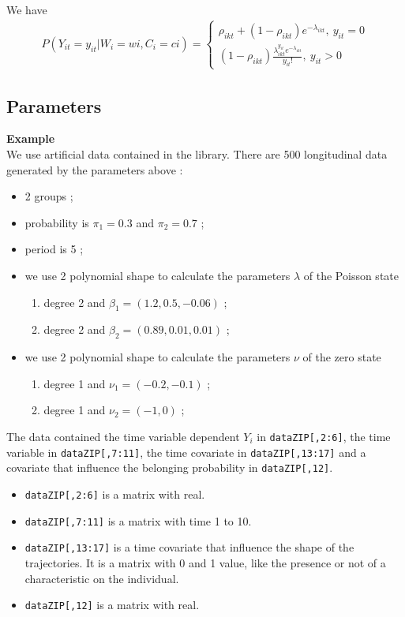 \documentclass{article}\usepackage[]{graphicx}\usepackage[]{color}
\begin{document}
We have
\begin{align}
P\left(Y_{it}=y_{it}|W_i=wi, C_i=ci\right) =
\left\lbrace
\begin{array}{l}
\rho_{ikt}+(1-\rho_{ikt})e^{-\lambda_{ikt}},\ y_{it}=0 \\
(1-\rho_{ikt})\frac{\lambda_{ikt}^{y_{it}}e^{-\lambda_{ikt}}}{y_{it}!},\ y_{it}> 0
\end{array}
\right.
\end{align}

\subsection{Parameters}

\textbf{Example}\\
We use artificial data contained in the library. There are 500 longitudinal data generated by the parameters above :
\begin{itemize}
	\item 2 groups ;
	\item probability is $\pi_1=0.3$ and $\pi_2=0.7$ ;
	\item period is 5 ;
	\item we use 2 polynomial shape to calculate the parameters $\lambda$ of the Poisson state
	\begin{enumerate}
		\item degree 2 and $\beta_1=(1.2, 0.5, -0.06)$ ;
		\item degree 2 and $\beta_2=(0.89, 0.01, 0.01)$ ;
	\end{enumerate}
		\item we use 2 polynomial shape to calculate the parameters $\nu$ of the zero state
	\begin{enumerate}
		\item degree 1 and $\nu_1=(-0.2,-0.1)$ ;
		\item degree 1 and $\nu_2=(-1,0)$ ;
	\end{enumerate}
\end{itemize}

The data contained the time variable dependent $Y_i$ in \verb|dataZIP[,2:6]|, the time variable in \verb|dataZIP[,7:11]|, the time covariate in \verb|dataZIP[,13:17]| and a covariate that influence the belonging probability in \verb|dataZIP[,12]|.
\begin{itemize}
	\item \verb|dataZIP[,2:6]| is a matrix with real.
	\item \verb|dataZIP[,7:11]| is a matrix with time 1 to 10.
	\item \verb|dataZIP[,13:17]| is a time covariate that influence the shape of the trajectories. It is a matrix with 0 and 1 value, like the presence or not of a characteristic on the individual.
	\item \verb|dataZIP[,12]| is a matrix with real.
\end{itemize}
\end{document}
